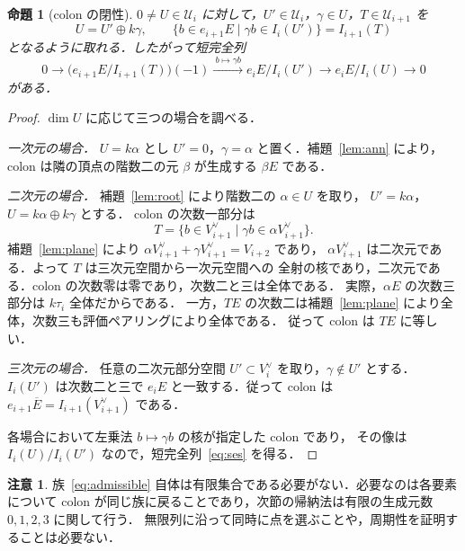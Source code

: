 \documentclass[a4paper,11pt]{ltjsarticle}
\newtheorem{proposition}[theorem]{命題}
\theoremstyle{definition}
\newtheorem{remark}[theorem]{注意}
\newcommand{\dual}{^{\vee}}
\newcommand{\barE}{\overline E}
\newcommand{\cU}{\mathcal U}
\begin{document}
\begin{proposition}[colon の閉性]\label{prop:colon}
$0\ne U\in\cU_i$ に対して，$U'\in\cU_i$，$\gamma\in U$，$T\in\cU_{i+1}$ を
\[
 U=U'\oplus k\gamma,\qquad
 \{b\in e_{i+1}E\mid\gamma b\in I_i(U')\}=I_{i+1}(T)
\]
となるように取れる．したがって短完全列
\begin{equation}\label{eq:ses}
 0\longrightarrow
 \bigl(e_{i+1}E/I_{i+1}(T)\bigr)(-1)
 \xrightarrow{\ b\mapsto\gamma b\ }
 e_iE/I_i(U')\longrightarrow e_iE/I_i(U)\longrightarrow0
\end{equation}
がある．
\end{proposition}
\begin{proof}
$\dim U$ に応じて三つの場合を調べる．

\emph{一次元の場合．}
$U=k\alpha$ とし $U'=0$，$\gamma=\alpha$ と置く．補題~\ref{lem:ann} により，
colon は隣の頂点の階数二の元 $\beta$ が生成する $\beta E$ である．

\emph{二次元の場合．}
補題~\ref{lem:root} により階数二の $\alpha\in U$ を取り，
$U'=k\alpha$，$U=k\alpha\oplus k\gamma$ とする．
colon の次数一部分は
\begin{equation}\label{eq:Tplane}
 T=\{b\in V_{i+1}\dual\mid\gamma b\in\alpha V_{i+1}\dual\}.
\end{equation}
補題~\ref{lem:plane} により $\alpha V_{i+1}\dual+\gamma V_{i+1}\dual=V_{i+2}$ であり，
$\alpha V_{i+1}\dual$ は二次元である．よって $T$ は三次元空間から一次元空間への
全射の核であり，二次元である．colon の次数零は零であり，次数二と三は全体である．
実際，$\alpha E$ の次数三部分は $k\tau_i$ 全体だからである．
一方，$TE$ の次数二は補題~\ref{lem:plane} により全体，次数三も評価ペアリングにより全体である．
従って colon は $TE$ に等しい．

\emph{三次元の場合．}
任意の二次元部分空間 $U'\subset V_i\dual$ を取り，$\gamma\notin U'$ とする．
$I_i(U')$ は次数二と三で $e_iE$ と一致する．従って colon は
$e_{i+1}\barE=I_{i+1}(V_{i+1}\dual)$ である．

各場合において左乗法 $b\mapsto\gamma b$ の核が指定した colon であり，
その像は $I_i(U)/I_i(U')$ なので，短完全列~\eqref{eq:ses} を得る．
\end{proof}

\begin{remark}
族~\eqref{eq:admissible} 自体は有限集合である必要がない．必要なのは各要素について
colon が同じ族に戻ることであり，次節の帰納法は有限の生成元数 $0,1,2,3$ に関して行う．
無限列に沿って同時に点を選ぶことや，周期性を証明することは必要ない．
\end{remark}
\end{document}
